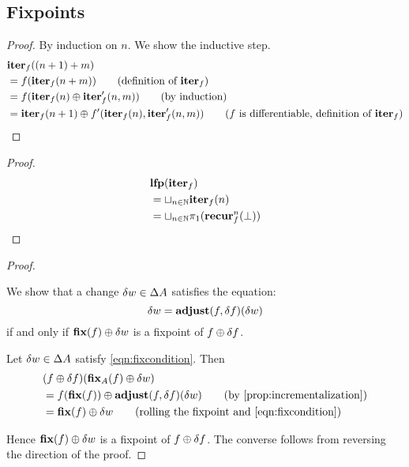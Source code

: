 \subsection{Fixpoints}

\iterDerivativesN*
\begin{proof}
  \label{prf:iterDerivativesN}
  By induction on $n$. We show the inductive step.
  \begin{align*}
    &\iter_f((n+1) + m)\\
    &=f(\iter_f(n + m)) \tag{definition of $\iter_f$}\\
    &=f(\iter_f(n) \cplus \derive{\iter_f}(n, m)) \tag{by induction}\\
    &=\iter_f(n+1) \cplus \derive{f}(\iter_f(n), \derive{\iter_f}(n, m)) \tag{$f$ is differentiable, definition of $\iter_f$}
  \end{align*}
\end{proof}

\fixpointIter*
\begin{proof}
  \label{prf:fixpointIter}
  \begin{align*}
    &\mathbf{lfp}(\mathbf{iter}_f)\\
    &=\sqcup_{n \in \mathbb{N}} \mathbf{iter}_f(n)\\
    &=\sqcup_{n \in \mathbb{N}} \pi_1 (\mathbf{recur}_f^n(\bot))
  \end{align*}
\end{proof}

\fixpointPseudoDerivatives*
\begin{proof}
  \label{prf:fixpointPseudoDerivatives}
  
  We show that a change $\delta w \in \Delta A$ satisfies
  the equation:
  \begin{equation}\label{eqn:fixcondition}
    \delta w = \mathbf{adjust}(f, \delta f)(\delta w)
  \end{equation}
  if and only if $\mathbf{fix}(f) \oplus \delta w$ is a fixpoint of $f \oplus \delta f$.

  Let $\delta w \in \Delta A$ satisfy \cref{eqn:fixcondition}. Then
  \begin{align*}
    &(f \cplus \change{f})(\fixpoint_A(f) \cplus \change{w})\\
    &= f(\fixpoint(f))
    \cplus
    \adjust(f, \change{f})(\change{w})
    \tag{by \cref{prop:incrementalization}}\\
    &= \fixpoint(f)
    \cplus
    \change{w}
    \tag{rolling the fixpoint and \cref{eqn:fixcondition}}
  \end{align*}

  Hence $\mathbf{fix}(f) \oplus \delta w$ is a fixpoint of $f \oplus \delta f$. The converse
  follows from reversing the direction of the proof.
\end{proof}


